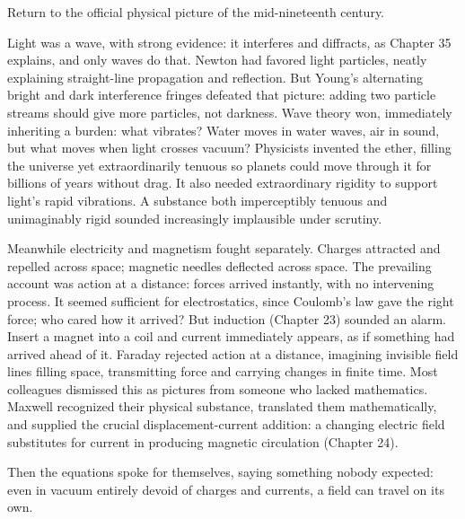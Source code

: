 
\begin{mainline}
Return to the official physical picture of the mid-nineteenth century.

Light was a wave, with strong evidence: it interferes and diffracts, as Chapter 35 explains, and only waves do that. Newton had favored light particles, neatly explaining straight-line propagation and reflection. But Young's alternating bright and dark interference fringes defeated that picture: adding two particle streams should give more particles, not darkness. Wave theory won, immediately inheriting a burden: what vibrates? Water moves in water waves, air in sound, but what moves when light crosses vacuum? Physicists invented the ether, filling the universe yet extraordinarily tenuous so planets could move through it for billions of years without drag. It also needed extraordinary rigidity to support light's rapid vibrations. A substance both imperceptibly tenuous and unimaginably rigid sounded increasingly implausible under scrutiny.

Meanwhile electricity and magnetism fought separately. Charges attracted and repelled across space; magnetic needles deflected across space. The prevailing account was action at a distance: forces arrived instantly, with no intervening process. It seemed sufficient for electrostatics, since Coulomb's law gave the right force; who cared how it arrived? But induction (Chapter 23) sounded an alarm. Insert a magnet into a coil and current immediately appears, as if something had arrived ahead of it. Faraday rejected action at a distance, imagining invisible field lines filling space, transmitting force and carrying changes in finite time. Most colleagues dismissed this as pictures from someone who lacked mathematics. Maxwell recognized their physical substance, translated them mathematically, and supplied the crucial displacement-current addition: a changing electric field substitutes for current in producing magnetic circulation (Chapter 24).

Then the equations spoke for themselves, saying something nobody expected: even in vacuum entirely devoid of charges and currents, a field can travel on its own.
\end{mainline}


